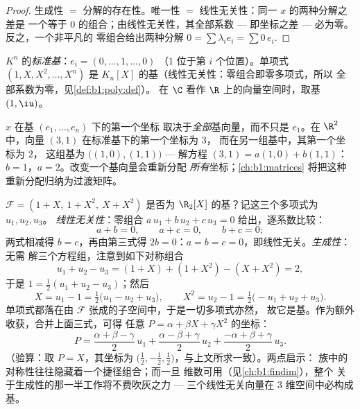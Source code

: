 \begin{proof}
生成性 $=$ 分解的存在性。唯一性 $=$
线性无关性：同一 $x$ 的两种分解之差是
一个等于 $0$ 的组合；由线性无关性，其全部系数 ---
即坐标之差 --- 必为零。反之，一个非平凡的
零组合给出两种分解 $0 = \sum \lambda_i
e_i = \sum 0\,e_i$.
\end{proof}

\begin{example}\label{ex:b1:vspaces:bases}
$K^n$ 的\emph{标准基}：$e_i = (0, \dots, 1, \dots, 0)$
（$1$ 位于第 $i$ 个位置）。单项式 $(1, X, X^2, \dots, X^n)$ 是
$K_n[X]$ 的基（线性无关性：零组合即零多项式，所以
全部系数为零，见\cref{def:b1:poly:def}）。
在 $\C$ 看作 $\R$ 上的向量空间时，取基 $(1, \iu)$。
\end{example}

\begin{remark}[坐标是集体协作的结果]
\label{rem:b1:vspaces:teameffort}
$x$ 在基 $(e_1, \dots, e_n)$ 下的第一个坐标
取决于\emph{全部}基向量，而不只是 $e_1$。在
$\R^2$ 中，向量 $(3, 1)$ 在标准基下的第一个坐标为 $3$，
而在另一组基中，其第一个坐标为 $2$，
这组基为 $\bigl((1,0), (1,1)\bigr)$ --- 解方程 $(3,1) = a(1,0) + b(1,1)$：
$b = 1$，$a = 2$。改变一个基向量会重新分配
\emph{所有}坐标；\cref{ch:b1:matrices} 将把这种
重新分配归纳为过渡矩阵。
\end{remark}

\begin{example}
\label{ex:b1:vspaces:testbasis}
$\mathcal{F} = (1 + X,\ 1 + X^2,\ X + X^2)$ 是否为
$\R_2[X]$ 的基？记这三个多项式为 $u_1, u_2, u_3$。
\emph{线性无关性}：零组合 $a\,u_1 + b\,u_2 + c\,u_3 =
0$ 给出，逐系数比较：
\[
a + b = 0, \qquad a + c = 0, \qquad b + c = 0 ;
\]
两式相减得 $b = c$，再由第三式得 $2b =
0$：$a = b = c = 0$，即线性无关。\emph{生成性}：无需
解三个方程组，注意到如下对称组合
\[
u_1 + u_2 - u_3 = (1 + X) + (1 + X^2) - (X + X^2) = 2 ,
\]
于是 $1 = \frac12(u_1 + u_2 - u_3)$；然后
\[
X = u_1 - 1 = \tfrac12\bigl(u_1 - u_2 + u_3\bigr),
\qquad
X^2 = u_2 - 1 = \tfrac12\bigl(-u_1 + u_2 + u_3\bigr).
\]
单项式都落在由 $\mathcal{F}$ 张成的子空间中，于是一切多项式亦然，
故它是基。作为额外收获，合并上面三式，可得
任意 $P = \alpha + \beta X + \gamma X^2$ 的坐标：
\[
P = \frac{\alpha + \beta - \gamma}{2}\,u_1
+ \frac{\alpha - \beta + \gamma}{2}\,u_2
+ \frac{-\alpha + \beta + \gamma}{2}\,u_3 .
\]
（验算：取 $P = X$，其坐标为 $\bigl(\frac12,
-\frac12, \frac12\bigr)$，与上文所求一致）。两点启示：
族中的对称性往往隐藏着一个捷径组合；而一旦
维数可用（见\cref{ch:b1:findim}），整个
关于生成性的那一半工作将不费吹灰之力 ---
三个线性无关向量在 $3$ 维空间中必构成基。
\end{example}

